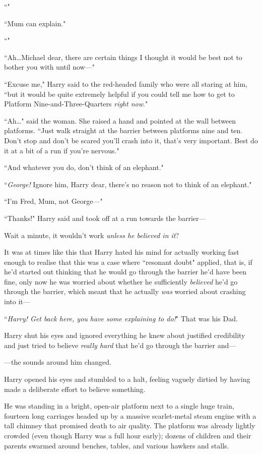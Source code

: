 ``"

``Mum can explain."

``"

``Ah…Michael dear, there are certain things I thought it would be best not to bother you with until now—"

``Excuse me," Harry said to the red-headed family who were all staring at him, ``but it would be quite extremely helpful if you could tell me how to get to Platform Nine-and-Three-Quarters \emph{right now}."

``Ah…" said the woman. She raised a hand and pointed at the wall between platforms. ``Just walk straight at the barrier between platforms nine and ten. Don't stop and don't be scared you'll crash into it, that's very important. Best do it at a bit of a run if you're nervous."

``And whatever you do, don't think of an elephant."

``\emph{George!} Ignore him, Harry dear, there's no reason not to think of an elephant."

``I'm Fred, Mum, not George—"

``Thanks!" Harry said and took off at a run towards the barrier—

Wait a minute, it wouldn't work \emph{unless he believed in it}?

It was at times like this that Harry hated his mind for actually working fast enough to realise that this was a case where ``resonant doubt" applied, that is, if he'd started out thinking that he would go through the barrier he'd have been fine, only now he was worried about whether he sufficiently \emph{believed} he'd go through the barrier, which meant that he actually \emph{was} worried about crashing into it—

``\emph{Harry! Get back here, you have some explaining to do!}" That was his Dad.

Harry shut his eyes and ignored everything he knew about justified credibility and just tried to believe \emph{really hard} that he'd go through the barrier and—

—the sounds around him changed.

Harry opened his eyes and stumbled to a halt, feeling vaguely dirtied by having made a deliberate effort to believe something.

He was standing in a bright, open-air platform next to a single huge train, fourteen long carriages headed up by a massive scarlet-metal steam engine with a tall chimney that promised death to air quality. The platform was already lightly crowded (even though Harry was a full hour early); dozens of children and their parents swarmed around benches, tables, and various hawkers and stalls.

